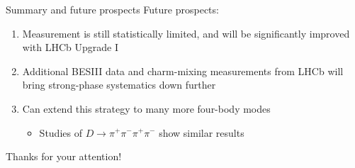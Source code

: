 \documentclass[xcolor={dvipsnames}]{beamer}
\begin{document}
\begin{frame}{Summary and future prospects}
  \vspace{0.3cm}
  {\Large Future prospects:}
  \vspace{0.5cm}
  \begin{enumerate}
    \setlength\itemsep{1.5em}
    \item{Measurement is still statistically limited, and will be significantly improved with LHCb Upgrade I}
    \item{Additional BESIII data and charm-mixing measurements from LHCb will bring strong-phase systematics down further}
    \item{Can extend this strategy to many more four-body modes}
    \begin{itemize}
      \item{Studies of $D\to\pi^+\pi^-\pi^+\pi^-$ show similar results}
    \end{itemize}
  \end{enumerate}
  \vspace{0.5cm}
  \begin{center}
    {\huge Thanks for your attention!}
  \end{center}
\end{frame}
\end{document}
